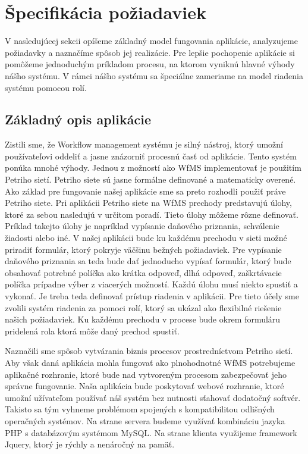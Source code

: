 


\section{Špecifikácia požiadaviek}
V nasledujúcej sekcii opíšeme základný model fungovania aplikácie, analyzujeme  požiadavky a naznačíme spôsob jej realizácie. Pre lepšie pochopenie aplikácie si pomôžeme jednoduchým príkladom procesu, na ktorom vyniknú hlavné výhody nášho systému. V rámci nášho systému sa špeciálne zameriame na model riadenia systému pomocou rolí.  

\subsection{Základný opis aplikácie}
Zistili sme, že Workflow management systému je silný nástroj, ktorý umožní používateľovi oddeliť a jasne znázorniť procesnú časť od aplikácie. Tento systém ponúka mnohé výhody. Jednou z možností ako WfMS implementovať je použitím Petriho sietí. Petriho siete sú jasne formálne definované a matematicky overené. Ako základ pre fungovanie našej aplikácie sme sa preto rozhodli použiť práve Petriho siete. Pri aplikácii Petriho siete na WfMS prechody predstavujú úlohy, ktoré za sebou nasledujú v určitom poradí. Tieto úlohy môžeme rôzne definovať.  Príklad takejto úlohy je napríklad vypísanie daňového priznania, schválenie žiadosti alebo iné. V našej aplikácii bude ku každému prechodu v sieti možné priradiť formulár, ktorý pokryje väčšinu bežných požiadaviek. Pre vypísanie daňového priznania sa teda bude dať jednoducho vypísať formulár, ktorý bude obsahovať potrebné políčka ako krátka odpoveď, dlhá odpoveď, zaškrtávacie políčka prípadne výber z viacerých možností. Každú úlohu musí niekto spustiť a vykonať. Je treba teda definovať prístup riadenia v aplikácii. Pre tieto účely sme zvolili systém riadenia za pomoci rolí, ktorý sa ukázal ako flexibilné riešenie našich požiadaviek. Ku každému prechodu v procese bude okrem formuláru pridelená rola ktorá môže daný prechod spustiť. 

Naznačili sme spôsob vytvárania biznis procesov prostredníctvom Petriho sietí. Aby však daná aplikácia mohla fungovať ako plnohodnotné WfMS potrebujeme aplikačné rozhranie, ktoré bude nad vytvoreným procesom zabezpečovať jeho správne fungovanie. Naša aplikácia bude poskytovať webové rozhranie, ktoré umožní užívateľom používať náš systém bez nutnosti sťahovať dodatočný softvér. Takisto sa tým vyhneme problémom spojených s kompatibilitou odlišných operačných systémov.  Na strane servera budeme využívať kombináciu jazyka PHP s databázovým systémom MySQL. Na strane klienta využijeme framework  Jquery, ktorý je rýchly a nenáročný na pamäť.

